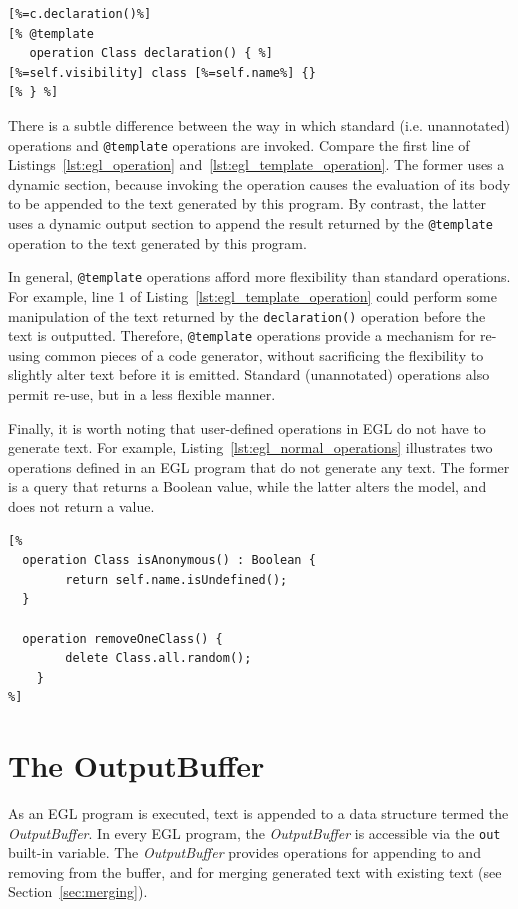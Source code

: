 \begin{lstlisting}[float=tbp, caption=Using a template operation to specify the text generated for a declaration of a Java class., label=lst:egl_template_operation, language=EGL]
[%=c.declaration()%]
[% @template
   operation Class declaration() { %]
[%=self.visibility] class [%=self.name%] {}
[% } %]
\end{lstlisting}

There is a subtle difference between the way in which standard (i.e. unannotated)
operations and \texttt{@template} operations are invoked. Compare the first line of Listings~\ref{lst:egl_operation} and~\ref{lst:egl_template_operation}. The former
uses a dynamic section, because invoking the operation causes the evaluation of 
its body to be appended to the text generated by this program. By contrast, the 
latter uses a dynamic output section to append the result returned by 
the \texttt{@template} operation to the text generated by this program.

In general, \texttt{@template} operations afford more flexibility than standard
operations. For example, line 1 of Listing~\ref{lst:egl_template_operation} could
perform some manipulation of the text returned by the \texttt{declaration()} operation
before the text is outputted. Therefore, \texttt{@template} operations provide
a mechanism for re-using common pieces of a code generator, without sacrificing the
flexibility to slightly alter text before it is emitted. Standard (unannotated) 
operations also permit re-use, but in a less flexible manner.

Finally, it is worth noting that user-defined operations in EGL do not have to 
generate text. For example, Listing~\ref{lst:egl_normal_operations} 
illustrates two operations defined in an EGL program that do not generate any text.
The former is a query that returns a Boolean value, while the latter alters the model,
and does not return a value.

\begin{lstlisting}[float=tbp, caption=Operations that do not generate any text., label=lst:egl_normal_operations, language=EGL]
[%
  operation Class isAnonymous() : Boolean {
		return self.name.isUndefined();
  }

  operation removeOneClass() {
		delete Class.all.random();
	}
%]
\end{lstlisting}

\section{The OutputBuffer}
As an EGL program is executed, text is appended to a data structure termed 
the \emph{OutputBuffer}. In every EGL program, the \emph{OutputBuffer} is 
accessible via the \texttt{out} built-in variable. The \emph{OutputBuffer} 
provides operations for appending to and removing from the buffer, and for 
merging generated text with existing text (see Section~\ref{sec:merging}).


